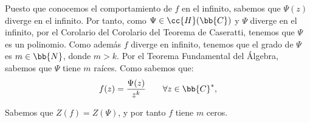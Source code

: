\documentclass[12pt]{article}
\begin{document}
\begin{ejercicio}[2.5 puntos]
        Puesto que conocemos el comportamiento de $f$ en el infinito, sabemos que $\Psi(z)$ diverge en el infinito. Por tanto, como $\Psi\in \cc{H}(\bb{C})$ y $\Psi$ diverge en el infinito, por el Corolario del Corolario del Teorema de Caseratti, tenemos que $\Psi$ es un polinomio. Como además $f$ diverge en infinito, tenemos que el grado de $\Psi$ es $m\in \bb{N}$, donde $m>k$. Por el Teorema Fundamental del Álgebra, sabemos que $\Psi$ tiene $m$ raíces. Como sabemos que:
        \begin{equation*}
            f(z) = \dfrac{\Psi(z)}{z^k}\qquad \forall z\in \bb{C}^*,
        \end{equation*}

        Sabemos que $Z(f) = Z(\Psi)$, y por tanto $f$ tiene $m$ ceros.
    \end{ejercicio}
\end{document}
